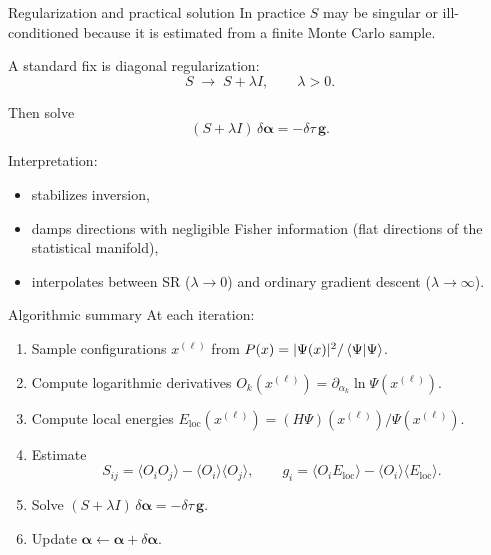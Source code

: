 \documentclass[aspectratio=169]{beamer}
\newcommand{\Eloc}{E_{\mathrm{loc}}}
\begin{document}
\begin{frame}{Regularization and practical solution}
In practice \(S\) may be singular or ill-conditioned because it is
estimated from a finite Monte Carlo sample.

A standard fix is diagonal regularization:
\[
S\;\to\;S+\lambda I,\qquad\lambda>0.
\]

Then solve
\[
(S+\lambda I)\,\delta\bm{\alpha}=-\delta\tau\,\bm{g}.
\]

Interpretation:
\begin{itemize}
  \item stabilizes inversion,
  \item damps directions with negligible Fisher information
        (flat directions of the statistical manifold),
  \item interpolates between SR (\(\lambda\to 0\)) and ordinary
        gradient descent (\(\lambda\to\infty\)).
\end{itemize}
\end{frame}

\begin{frame}{Algorithmic summary}
At each iteration:
\begin{enumerate}
  \item Sample configurations \(x^{(\ell)}\) from
        \(P(x)=|\Psi(x)|^2/\braket{\Psi}{\Psi}\).
  \item Compute logarithmic derivatives
        \(O_k(x^{(\ell)})=\partial_{\alpha_k}\ln\Psi(x^{(\ell)})\).
  \item Compute local energies
        \(\Eloc(x^{(\ell)})=(H\Psi)(x^{(\ell)})/\Psi(x^{(\ell)})\).
  \item Estimate
  \[
  S_{ij}=\langle O_iO_j\rangle-\langle O_i\rangle\langle O_j\rangle,
  \qquad
  g_i=\langle O_i\Eloc\rangle-\langle O_i\rangle\langle\Eloc\rangle.
  \]
  \item Solve \((S+\lambda I)\,\delta\bm{\alpha}=-\delta\tau\,\bm{g}\).
  \item Update \(\bm{\alpha}\leftarrow\bm{\alpha}+\delta\bm{\alpha}\).
\end{enumerate}
\end{frame}
\end{document}
